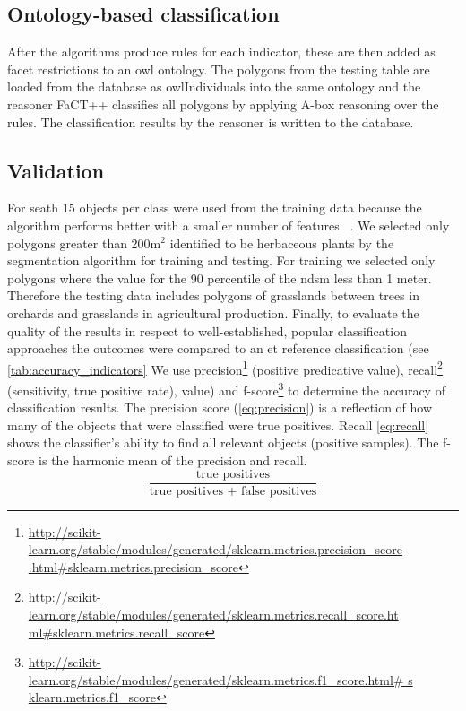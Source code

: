 \documentclass[authoryear,review,12pt,number]{elsarticle}
\begin{document}
\subsection{Ontology-based classification}
\label{subsec:Onto_classification}


After the algorithms produce rules for each indicator, these are then added as 
facet restrictions to an \gls{owl} ontology. The polygons from the testing 
table 
are 
loaded from the database as \gls{owl}Individuals into the same ontology and the 
reasoner FaCT++ classifies all polygons by applying A-box reasoning over the 
rules. The classification results by the reasoner is written to the database. 
\subsection{Validation} 
\label{subsec:Validation}
For \gls{seath} 15 objects per class were used from the training data 
because the algorithm performs better with a smaller number of features 
~\citep{Nussbaum2006}. We selected only polygons greater than 200m$^{2}$ 
identified to be herbaceous plants by the segmentation algorithm for training 
and testing. For training we selected only polygons where the value for the 90 
percentile of the \gls{ndsm} less than 1 meter. Therefore the testing data 
includes polygons of grasslands between trees in orchards and grasslands in 
agricultural production. Finally, to evaluate the quality of the results in 
respect to well-established, popular classification approaches the outcomes 
were compared to an \gls{et} reference classification (see 
\ref{tab:accuracy_indicators}
We use precision\footnote{\url{
http://scikit-learn.org/stable/modules/generated/sklearn.metrics.precision_score
.html\#sklearn.metrics.precision\_score}} (positive predicative value), 
recall\footnote{\url{
http://scikit-learn.org/stable/modules/generated/sklearn.metrics.recall_score.ht
ml\#sklearn.metrics.recall\_score}} (sensitivity, true positive rate), 
value) and 
f-score\footnote{\url{
http://scikit-learn.org/stable/modules/generated/sklearn.metrics.f1_score.html\#
s
klearn.metrics.f1\_score}} to determine the accuracy of classification results. 
The precision score (\ref{eq:precision}) is a reflection of how many of the 
objects that were classified were true positives. Recall \ref{eq:recall} shows 
the classifier's ability to find all relevant objects (positive samples). The 
f-score is the harmonic mean of the precision and recall.
\begin{equation}\label{eq:precision}
    \frac{\text{true positives}}{\text{true positives + false positives}}
\end{equation}
\end{document}
